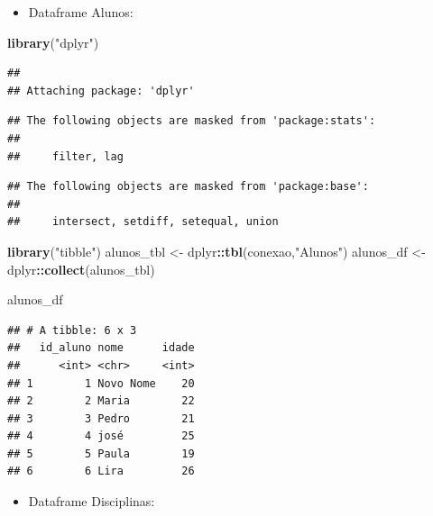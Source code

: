\documentclass[
]{article}
\newenvironment{Shaded}{\begin{snugshade}}{\end{snugshade}}
\newcommand{\FunctionTok}[1]{\textcolor[rgb]{0.13,0.29,0.53}{\textbf{#1}}}
\newcommand{\NormalTok}[1]{#1}
\newcommand{\OtherTok}[1]{\textcolor[rgb]{0.56,0.35,0.01}{#1}}
\newcommand{\SpecialCharTok}[1]{\textcolor[rgb]{0.81,0.36,0.00}{\textbf{#1}}}
\newcommand{\StringTok}[1]{\textcolor[rgb]{0.31,0.60,0.02}{#1}}
\providecommand{\tightlist}{%
  \setlength{\itemsep}{0pt}\setlength{\parskip}{0pt}}
\begin{document}
\begin{itemize}
\tightlist
\item
  Dataframe Alunos:
\end{itemize}

\begin{Shaded}
\begin{Highlighting}[]
\FunctionTok{library}\NormalTok{(}\StringTok{"dplyr"}\NormalTok{)}
\end{Highlighting}
\end{Shaded}

\begin{verbatim}
## 
## Attaching package: 'dplyr'
\end{verbatim}

\begin{verbatim}
## The following objects are masked from 'package:stats':
## 
##     filter, lag
\end{verbatim}

\begin{verbatim}
## The following objects are masked from 'package:base':
## 
##     intersect, setdiff, setequal, union
\end{verbatim}

\begin{Shaded}
\begin{Highlighting}[]
\FunctionTok{library}\NormalTok{(}\StringTok{"tibble"}\NormalTok{)}
\NormalTok{alunos\_tbl }\OtherTok{\textless{}{-}}\NormalTok{ dplyr}\SpecialCharTok{::}\FunctionTok{tbl}\NormalTok{(conexao,}\StringTok{"Alunos"}\NormalTok{)}
\NormalTok{alunos\_df }\OtherTok{\textless{}{-}}\NormalTok{ dplyr}\SpecialCharTok{::}\FunctionTok{collect}\NormalTok{(alunos\_tbl)}
\end{Highlighting}
\end{Shaded}

\begin{Shaded}
\begin{Highlighting}[]
\NormalTok{alunos\_df}
\end{Highlighting}
\end{Shaded}

\begin{verbatim}
## # A tibble: 6 x 3
##   id_aluno nome      idade
##      <int> <chr>     <int>
## 1        1 Novo Nome    20
## 2        2 Maria        22
## 3        3 Pedro        21
## 4        4 josé         25
## 5        5 Paula        19
## 6        6 Lira         26
\end{verbatim}

\begin{itemize}
\tightlist
\item
  Dataframe Disciplinas:
\end{itemize}
\end{document}
